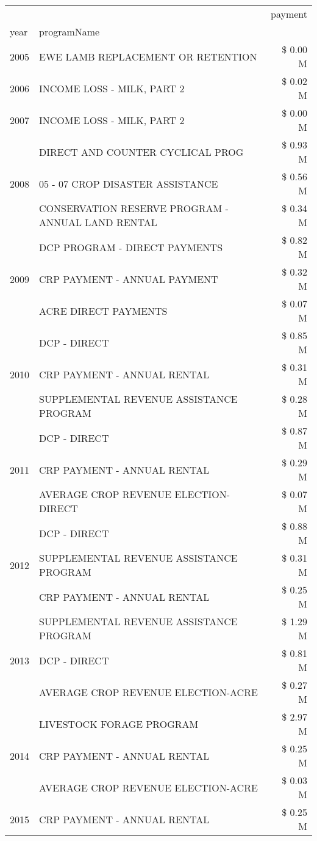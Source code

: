\begin{tabular}{llr}
\toprule
 &  & payment \\
year & programName &  \\
\midrule
2005 & EWE LAMB REPLACEMENT OR RETENTION & \$ 0.00 M \\
\cline{1-3}
2006 & INCOME LOSS - MILK, PART 2 & \$ 0.02 M \\
\cline{1-3}
2007 & INCOME LOSS - MILK, PART 2 & \$ 0.00 M \\
\cline{1-3}
\multirow[t]{3}{*}{2008} & DIRECT AND COUNTER CYCLICAL PROG & \$ 0.93 M \\
 & 05 - 07 CROP DISASTER ASSISTANCE & \$ 0.56 M \\
 & CONSERVATION RESERVE PROGRAM - ANNUAL LAND RENTAL & \$ 0.34 M \\
\cline{1-3}
\multirow[t]{3}{*}{2009} & DCP PROGRAM - DIRECT PAYMENTS & \$ 0.82 M \\
 & CRP PAYMENT - ANNUAL PAYMENT & \$ 0.32 M \\
 & ACRE DIRECT PAYMENTS & \$ 0.07 M \\
\cline{1-3}
\multirow[t]{3}{*}{2010} & DCP - DIRECT & \$ 0.85 M \\
 & CRP PAYMENT - ANNUAL RENTAL & \$ 0.31 M \\
 & SUPPLEMENTAL REVENUE ASSISTANCE PROGRAM & \$ 0.28 M \\
\cline{1-3}
\multirow[t]{3}{*}{2011} & DCP - DIRECT & \$ 0.87 M \\
 & CRP PAYMENT - ANNUAL RENTAL & \$ 0.29 M \\
 & AVERAGE CROP REVENUE ELECTION-DIRECT & \$ 0.07 M \\
\cline{1-3}
\multirow[t]{3}{*}{2012} & DCP - DIRECT & \$ 0.88 M \\
 & SUPPLEMENTAL REVENUE ASSISTANCE PROGRAM & \$ 0.31 M \\
 & CRP PAYMENT - ANNUAL RENTAL & \$ 0.25 M \\
\cline{1-3}
\multirow[t]{3}{*}{2013} & SUPPLEMENTAL REVENUE ASSISTANCE PROGRAM & \$ 1.29 M \\
 & DCP - DIRECT & \$ 0.81 M \\
 & AVERAGE CROP REVENUE ELECTION-ACRE & \$ 0.27 M \\
\cline{1-3}
\multirow[t]{3}{*}{2014} & LIVESTOCK FORAGE PROGRAM & \$ 2.97 M \\
 & CRP PAYMENT - ANNUAL RENTAL & \$ 0.25 M \\
 & AVERAGE CROP REVENUE ELECTION-ACRE & \$ 0.03 M \\
\cline{1-3}
\multirow[t]{3}{*}{2015} & CRP PAYMENT - ANNUAL RENTAL & \$ 0.25 M \\

\end{tabular}
